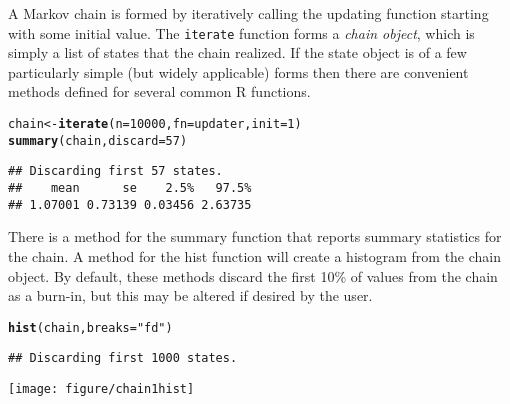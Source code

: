 \documentclass{article}\usepackage[]{graphicx}\usepackage[]{color}
\makeatletter
\def\maxwidth{ %
  \ifdim\Gin@nat@width>\linewidth
    \linewidth
  \else
    \Gin@nat@width
  \fi
}
\newcommand{\hlnum}[1]{\textcolor[rgb]{0.686,0.059,0.569}{#1}}%
\newcommand{\hlstr}[1]{\textcolor[rgb]{0.192,0.494,0.8}{#1}}%
\newcommand{\hlstd}[1]{\textcolor[rgb]{0.345,0.345,0.345}{#1}}%
\newcommand{\hlkwb}[1]{\textcolor[rgb]{0.69,0.353,0.396}{#1}}%
\newcommand{\hlkwc}[1]{\textcolor[rgb]{0.333,0.667,0.333}{#1}}%
\newcommand{\hlkwd}[1]{\textcolor[rgb]{0.737,0.353,0.396}{\textbf{#1}}}%
\newenvironment{kframe}{%
 \def\at@end@of@kframe{}%
 \ifinner\ifhmode%
  \def\at@end@of@kframe{\end{minipage}}%
  \begin{minipage}{\columnwidth}%
 \fi\fi%
 \def\FrameCommand##1{\hskip\@totalleftmargin \hskip-\fboxsep
 \colorbox{shadecolor}{##1}\hskip-\fboxsep
     \hskip-\linewidth \hskip-\@totalleftmargin \hskip\columnwidth}%
 \MakeFramed {\advance\hsize-\width
   \@totalleftmargin\z@ \linewidth\hsize
   \@setminipage}}%
 {\par\unskip\endMakeFramed%
 \at@end@of@kframe}
\newenvironment{knitrout}{}{} %
\makeatother
\begin{document}
A Markov chain is formed by iteratively calling the updating function
starting with some initial value. The {\tt iterate} function forms a
{\it chain object}, which is simply a list of states that the chain
realized. If the state object is of a few particularly simple (but
widely applicable) forms then there are convenient methods defined for
several common R functions.
\begin{knitrout}
\color{fgcolor}\begin{kframe}
\begin{alltt}
\hlstd{chain} \hlkwb{<-} \hlkwd{iterate}\hlstd{(}\hlkwc{n} \hlstd{=} \hlnum{10000}\hlstd{,} \hlkwc{fn} \hlstd{= updater,} \hlkwc{init} \hlstd{=} \hlnum{1}\hlstd{)}
\hlkwd{summary}\hlstd{(chain,} \hlkwc{discard} \hlstd{=} \hlnum{57}\hlstd{)}
\end{alltt}
\begin{verbatim}
## Discarding first 57 states.
##    mean      se    2.5%   97.5% 
## 1.07001 0.73139 0.03456 2.63735
\end{verbatim}
\end{kframe}
\end{knitrout}


There is a method for the summary function that reports summary
statistics for the chain. A method for the hist function will create a
histogram from the chain object. By default, these methods discard the
first 10\% of values from the chain as a burn-in, but this may be
altered if desired by the user.
\begin{knitrout}
\color{fgcolor}\begin{kframe}
\begin{alltt}
\hlkwd{hist}\hlstd{(chain,} \hlkwc{breaks} \hlstd{=} \hlstr{"fd"}\hlstd{)}
\end{alltt}
\begin{verbatim}
## Discarding first 1000 states.
\end{verbatim}
\end{kframe}
\texttt{[image: figure/chain1hist]} 

\end{knitrout}
\end{document}
